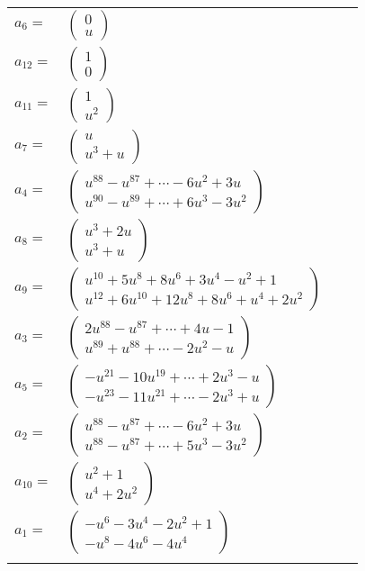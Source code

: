 \documentclass[1p]{elsarticle_modified}
\theoremstyle{definition}
\begin{document}
\begin{tabular}{m{7pt} m{180pt} m{7pt} m{180pt} }
\flushright $a_{6}=$&$\begin{pmatrix}0\\u\end{pmatrix}$ \\
\flushright $a_{12}=$&$\begin{pmatrix}1\\0\end{pmatrix}$ \\
\flushright $a_{11}=$&$\begin{pmatrix}1\\u^2\end{pmatrix}$ \\
\flushright $a_{7}=$&$\begin{pmatrix}u\\u^3+u\end{pmatrix}$ \\
\flushright $a_{4}=$&$\begin{pmatrix}u^{88}- u^{87}+\cdots-6 u^2+3 u\\u^{90}- u^{89}+\cdots+6 u^3-3 u^2\end{pmatrix}$ \\
\flushright $a_{8}=$&$\begin{pmatrix}u^3+2 u\\u^3+u\end{pmatrix}$ \\
\flushright $a_{9}=$&$\begin{pmatrix}u^{10}+5 u^8+8 u^6+3 u^4- u^2+1\\u^{12}+6 u^{10}+12 u^8+8 u^6+u^4+2 u^2\end{pmatrix}$ \\
\flushright $a_{3}=$&$\begin{pmatrix}2 u^{88}- u^{87}+\cdots+4 u-1\\u^{89}+u^{88}+\cdots-2 u^2- u\end{pmatrix}$ \\
\flushright $a_{5}=$&$\begin{pmatrix}- u^{21}-10 u^{19}+\cdots+2 u^3- u\\- u^{23}-11 u^{21}+\cdots-2 u^3+u\end{pmatrix}$ \\
\flushright $a_{2}=$&$\begin{pmatrix}u^{88}- u^{87}+\cdots-6 u^2+3 u\\u^{88}- u^{87}+\cdots+5 u^3-3 u^2\end{pmatrix}$ \\
\flushright $a_{10}=$&$\begin{pmatrix}u^2+1\\u^4+2 u^2\end{pmatrix}$ \\
\flushright $a_{1}=$&$\begin{pmatrix}- u^6-3 u^4-2 u^2+1\\- u^8-4 u^6-4 u^4\end{pmatrix}$\\&\end{tabular}
\end{document}
